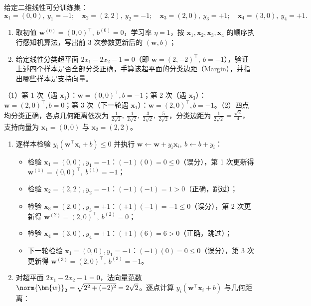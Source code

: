 \begin{exercise}[title={感知机迭代更新与 SVM 几何边距手算},level=standard,points=15,tags={感知机,SVM,分类边距,支持向量}]
给定二维线性可分训练集：
\[
  \bm{x}_1=(0,0),\ y_1=-1;\quad
  \bm{x}_2=(2,2),\ y_2=-1;\quad
  \bm{x}_3=(2,0),\ y_3=+1;\quad
  \bm{x}_4=(3,0),\ y_4=+1.
\]
\begin{enumerate}
  \item 取初值 $\bm{w}^{(0)}=(0,0)^\top,\ b^{(0)}=0$，学习率 $\eta=1$，按 $\bm{x}_1, \bm{x}_2, \bm{x}_3, \bm{x}_4$ 的顺序执行感知机算法，写出前 $3$ 次参数更新后的 $(\bm{w}, b)$；
  \item 给定线性分类超平面 $2x_1 - 2x_2 - 1 = 0$（即 $\bm{w}=(2,-2)^\top,\ b=-1$），验证上述四个样本是否全部分类正确，手算该超平面的分类边距（Margin），并指出哪些样本是支持向量。
\end{enumerate}
\begin{answer}
（1）第 1 次（遇 $\bm{x}_1$）：$\bm{w}=(0,0)^\top, b=-1$；第 2 次（遇 $\bm{x}_3$）：$\bm{w}=(2,0)^\top, b=0$；第 3 次（下一轮遇 $\bm{x}_1$）：$\bm{w}=(2,0)^\top, b=-1$。（2）四点均分类正确，各点几何距离依次为 $\frac{1}{2\sqrt{2}},\ \frac{1}{2\sqrt{2}},\ \frac{3}{2\sqrt{2}},\ \frac{5}{2\sqrt{2}}$，分类边距为 $\frac{1}{2\sqrt{2}} = \frac{\sqrt{2}}{4}$，支持向量为 $\bm{x}_1=(0,0)$ 与 $\bm{x}_2=(2,2)$。
\end{answer}
\begin{solution}
\begin{enumerate}
  \item 逐样本检验 $y_i(\bm{w}^\top\bm{x}_i + b) \le 0$ 并执行 $\bm{w}\gets\bm{w}+y_i\bm{x}_i,\ b\gets b+y_i$：
  \begin{itemize}
    \item 检验 $\bm{x}_1=(0,0), y_1=-1$：$(-1)(0) = 0 \le 0$（误分），第 1 次更新得 $\bm{w}^{(1)}=(0,0)^\top,\ b^{(1)}=-1$；
    \item 检验 $\bm{x}_2=(2,2), y_2=-1$：$(-1)(-1) = 1 > 0$（正确，跳过）；
    \item 检验 $\bm{x}_3=(2,0), y_3=+1$：$(+1)(-1) = -1 \le 0$（误分），第 2 次更新得 $\bm{w}^{(2)}=(2,0)^\top,\ b^{(2)}=0$；
    \item 检验 $\bm{x}_4=(3,0), y_4=+1$：$(+1)(6) = 6 > 0$（正确，跳过）；
    \item 下一轮检验 $\bm{x}_1=(0,0), y_1=-1$：$(-1)(0) = 0 \le 0$（误分），第 3 次更新得 $\bm{w}^{(3)}=(2,0)^\top,\ b^{(3)}=-1$。
  \end{itemize}
  \item 对超平面 $2x_1 - 2x_2 - 1 = 0$，法向量范数 $\norm{\bm{w}}_2 = \sqrt{2^2 + (-2)^2} = 2\sqrt{2}$。逐点计算 $y_i(\bm{w}^\top\bm{x}_i + b)$ 与几何距离：

\end{enumerate}
\end{solution}
\end{exercise}
